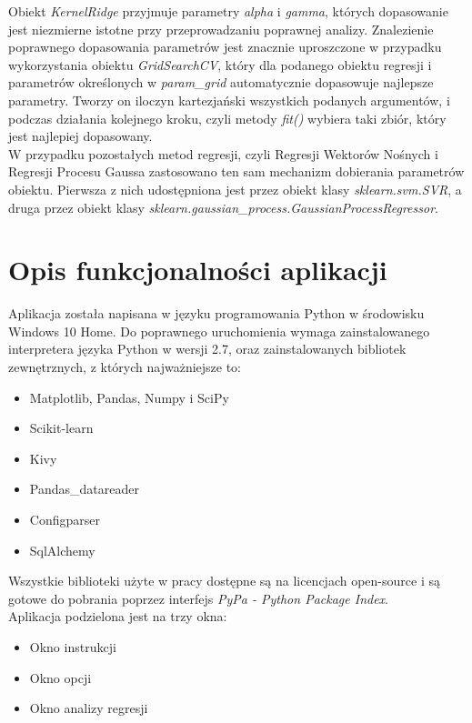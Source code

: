 Obiekt \textit{KernelRidge} przyjmuje parametry \textit{alpha} i \textit{gamma}, których dopasowanie jest niezmierne istotne przy przeprowadzaniu poprawnej analizy.
Znalezienie poprawnego dopasowania parametrów jest znacznie uproszczone w przypadku wykorzystania obiektu \textit{GridSearchCV}, 
który dla podanego obiektu regresji i parametrów określonych w \textit{param\_grid} automatycznie dopasowuje najlepsze parametry.
Tworzy on iloczyn kartezjański wszystkich podanych argumentów, i podczas działania kolejnego kroku, czyli metody \textit{fit()} wybiera taki zbiór, który jest najlepiej dopasowany.\\

W przypadku pozostałych metod regresji, czyli Regresji Wektorów Nośnych i Regresji Procesu Gaussa zastosowano ten sam mechanizm dobierania parametrów obiektu.
Pierwsza z nich udostępniona jest przez obiekt klasy \textit{sklearn.svm.SVR}, a druga przez obiekt klasy \textit{sklearn.gaussian\_process.GaussianProcessRegressor}.


\section{Opis funkcjonalności aplikacji}
Aplikacja została napisana w języku programowania Python w środowisku Windows 10 Home.
Do poprawnego uruchomienia wymaga zainstalowanego interpretera języka Python w wersji 2.7, oraz zainstalowanych bibliotek zewnętrznych, z których najważniejsze to:
\begin{itemize}
 \item Matplotlib, Pandas, Numpy i SciPy
 \item Scikit-learn
 \item Kivy
 \item Pandas\_datareader
 \item Configparser
 \item SqlAlchemy
\end{itemize}

Wszystkie biblioteki użyte w pracy dostępne są na licencjach open-source i są gotowe do pobrania poprzez interfejs \textit{PyPa - Python Package Index}.\\

Aplikacja podzielona jest na trzy okna:
\begin{itemize}
 \item Okno instrukcji
 \item Okno opcji
 \item Okno analizy regresji
\end{itemize}

